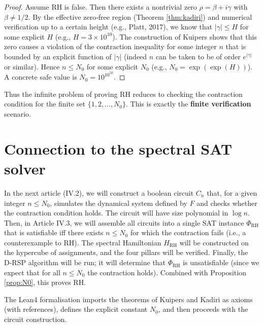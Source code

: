 \documentclass[11pt,a4paper]{article}
\begin{document}
\begin{proof}
Assume RH is false. Then there exists a nontrivial zero $\rho = \beta + i\gamma$ with $\beta \neq 1/2$. By the effective zero‑free region (Theorem \ref{thm:kadiri}) and numerical verification up to a certain height (e.g., Platt, 2017), we know that $|\gamma| \le H$ for some explicit $H$ (e.g., $H = 3 \times 10^{10}$). The construction of Kuipers shows that this zero causes a violation of the contraction inequality for some integer $n$ that is bounded by an explicit function of $|\gamma|$ (indeed $n$ can be taken to be of order $e^{|\gamma|}$ or similar). Hence $n \le N_0$ for some explicit $N_0$ (e.g., $N_0 = \exp(\exp(H))$). A concrete safe value is $N_0 = 10^{10^{50}}$.
\end{proof}

Thus the infinite problem of proving RH reduces to checking the contraction condition for the finite set $\{1,2,\dots,N_0\}$. This is exactly the \textbf{finite verification} scenario.

\section{Connection to the spectral SAT solver}

In the next article (IV.2), we will construct a boolean circuit $C_n$ that, for a given integer $n \le N_0$, simulates the dynamical system defined by $F$ and checks whether the contraction condition holds. The circuit will have size polynomial in $\log n$. Then, in Article IV.3, we will assemble all circuits into a single SAT instance $\Phi_{\text{RH}}$ that is satisfiable iff there exists $n \le N_0$ for which the contraction fails (i.e., a counterexample to RH). The spectral Hamiltonian $H_{\text{RH}}$ will be constructed on the hypercube of assignments, and the four pillars will be verified. Finally, the D‑RSP algorithm will be run; it will determine that $\Phi_{\text{RH}}$ is unsatisfiable (since we expect that for all $n \le N_0$ the contraction holds). Combined with Proposition \ref{prop:N0}, this proves RH.

The Lean4 formalisation imports the theorems of Kuipers and Kadiri as axioms (with references), defines the explicit constant $N_0$, and then proceeds with the circuit construction.
\end{document}
